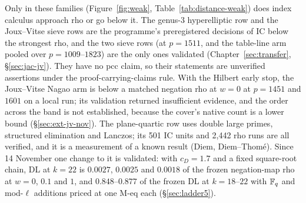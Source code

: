 Only in these families (Figure~\ref{fig:weak},
Table~\ref{tab:distance-weak}) does index calculus approach rho or go
below it. The genus-3 hyperelliptic row and the Joux--Vitse sieve rows are
the programme's preregistered decisions of IC below the strongest rho, and
the two sieve rows (at $p=1511$, and the table-line arm pooled over
$p=1009$--$1823$) are the only ones validated
(Chapter~\ref{sec:transfer}, \S\ref{sec:jac-jv}). They have no pcc claim, so
their statements are unverified assertions under the proof-carrying-claims
rule. With the Hilbert early stop, the Joux--Vitse Nagao arm is below a
matched negation rho at $w=0$ at $p=1451$ and $1601$ on a local run; its
validation returned insufficient evidence, and the order across the band
is not established, because the cover's native count is a lower bound
(\S\ref{sec:ext-jv-nov}). The plane-quartic row uses double large
primes, structured elimination and Lanczos; its 501 IC units and 2{,}442
rho runs are all verified, and it is a measurement of a known result
(Diem, Diem--Thomé). Since 14 November one change to it is validated: with
$c_D=1.7$ and a fixed square-root chain, DL at $k=22$ is $0.0027$, $0.0025$
and $0.0018$ of the frozen negation-map rho at $w=0$, $0.1$ and $1$, and
$0.848$--$0.877$ of the frozen DL at $k=18$--$22$ with $\mathbb{F}_q$ and
mod-$\ell$ additions priced at one M-eq each (\S\ref{sec:ladder5}).

